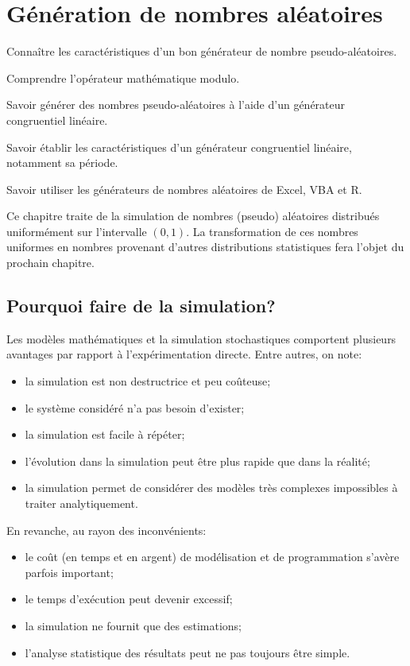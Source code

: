 \chapter{Génération de nombres aléatoires}
\label{chap:generation}

\begin{objectifs}
\item Connaître les caractéristiques d’un bon générateur de nombre
  pseudo-aléatoires.
\item Comprendre l’opérateur mathématique modulo.
\item Savoir générer des nombres pseudo-aléatoires à l’aide d’un
  générateur congruentiel linéaire.
\item Savoir établir les caractéristiques d’un générateur congruentiel
  linéaire, notamment sa période.
\item Savoir utiliser les générateurs de nombres aléatoires de Excel,
  VBA et R.
\end{objectifs}

Ce chapitre traite de la simulation de nombres (pseudo) aléatoires
distribués uniformément sur l'intervalle $(0, 1)$. La transformation
de ces nombres uniformes en nombres provenant d'autres distributions
statistiques fera l'objet du prochain chapitre.


\section{Pourquoi faire de la simulation?}
\label{sec:generation:pourquoi}

Les modèles mathématiques et la simulation stochastiques comportent
plusieurs avantages par rapport à l'expérimentation directe. Entre
autres, on note:
\begin{itemize}
\item la simulation est non destructrice et peu coûteuse;
\item le système considéré n'a pas besoin d'exister;
\item la simulation est facile à répéter;
\item l'évolution dans la simulation peut être plus rapide que dans la
  réalité;
\item la simulation permet de considérer des modèles très complexes
  impossibles à traiter analytiquement.
\end{itemize}
En revanche, au rayon des inconvénients:
\begin{itemize}
\item le coût (en temps et en argent) de modélisation et de
  programmation s'avère parfois important;
\item le temps d'exécution peut devenir excessif;
\item la simulation ne fournit que des estimations;
\item l'analyse statistique des résultats peut ne pas toujours être
  simple.
\end{itemize}

